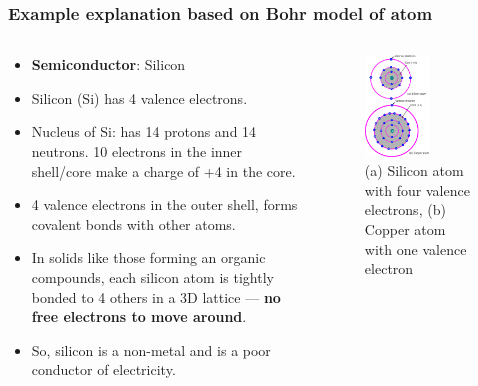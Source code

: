 \begin{frame}
	\frametitle{Example explanation based on Bohr model of atom}
	\begin{columns}
		\begin{column}{0.6\textwidth}
            \begin{itemize}
                \item \textbf{Semiconductor}: Silicon
                \item Silicon (Si) has 4 valence electrons.
                \item Nucleus of Si: has 14 protons and 14 neutrons. 10 electrons in the inner shell/core make a charge of +4 in the core.
                \item 4 valence electrons in the outer shell, forms covalent bonds with other atoms.
                \item In solids like those forming an organic compounds, each silicon atom is tightly bonded to 4 others in a 3D lattice — \textbf{no free electrons to move around}.
                \item So, silicon is a non-metal and is a poor conductor of electricity.
            \end{itemize}
		\end{column}
        \hfill
		\begin{column}{0.4\textwidth}
            \begin{figure}
                \centering
                \includegraphics[width=0.6\textwidth]{fig/lec02/Cu_Si_atom.pdf}
                \caption{(a) Silicon atom with four valence electrons, (b) Copper atom with one valence electron}
            \end{figure}
		\end{column}
		\end{columns}
\end{frame}

